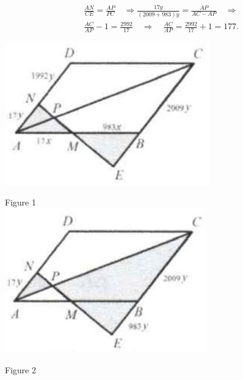 \documentclass{article}
\begin{document}
\[
\begin{aligned}
& \frac{A N}{C E}=\frac{A P}{P C} \quad \Rightarrow \frac{17 y}{(2009+983) y}=\frac{A P}{A C-A P} \quad \Rightarrow \\
& \frac{A C}{A P}-1=\frac{2992}{17} \quad \Rightarrow \quad \frac{A C}{A P}=\frac{2992}{17}+1=177 .
\end{aligned}
\]

\begin{center}
\includegraphics[width=\textwidth]{images/142(1).jpg}
\end{center}

Figure 1\\
\centering
\includegraphics[width=\textwidth]{images/142(4).jpg}

Figure 2
\end{document}
